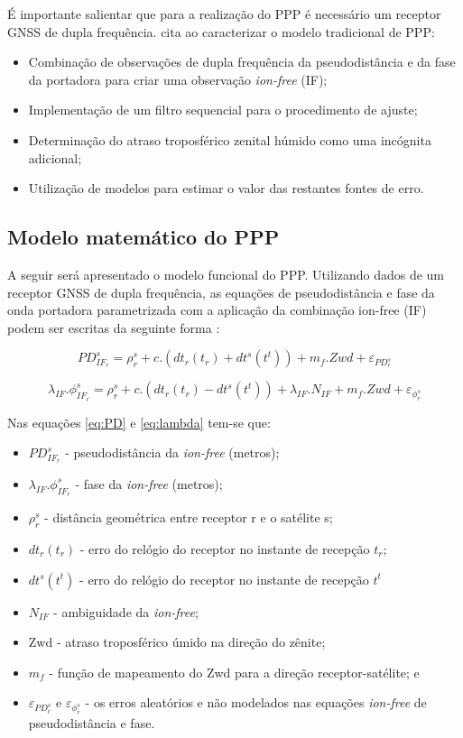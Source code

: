 É importante salientar que para a realização do PPP é necessário um receptor GNSS de dupla frequência. \cite{cunha2016_PPP} cita \cite{kouba2001precise} ao caracterizar o modelo tradicional de PPP:
\begin{itemize}
    \item Combinação de observações de dupla frequência da pseudodistância e da fase da portadora para criar uma observação \textit{ion-free} (IF);
    \item Implementação de um filtro sequencial para o procedimento de ajuste;
    \item Determinação do atraso troposférico zenital húmido como uma incógnita adicional;
    \item Utilização de modelos para estimar o valor das restantes fontes de erro.
\end{itemize}


\subsection{Modelo matemático do PPP}
\noindent

A seguir será apresentado o modelo funcional do PPP. Utilizando dados de um receptor GNSS de dupla frequência, as equações de pseudodistância e fase da onda portadora parametrizada com a aplicação da combinação ion-free (IF) podem ser escritas da seguinte forma \citep{marques2012ppp}:

\begin{equation}
    \label{eq:PD}
    PD_{IF_r}^{s}=\rho_r^s+c.(dt_r(t_r)+dt^s(t^t))+m_f.Zwd+\varepsilon_{PD_r^{s}}
\end{equation}

\begin{equation}
    \label{eq:lambda}
    \lambda_{IF}.\phi_{IF_r}^{s}=\rho_r^s+c.(dt_r(t_r)-dt^s(t^t))+\lambda_{IF}.N_{IF}+m_f.Zwd+\varepsilon_{\phi_r^{s}}
\end{equation}

Nas equações \ref{eq:PD} e \ref{eq:lambda} tem-se que:
\begin{itemize}
    \item $PD_{IF_r}^{s}$ - pseudodistância da \textit{ion-free} (metros);
    \item $\lambda_{IF}.\phi_{IF_r}^{s}$ - fase da \textit{ion-free} (metros);
    \item $\rho_r^s$ - distância geométrica entre receptor r e o satélite s;
    \item $dt_r(t_r)$ - erro do relógio do receptor no instante de recepção $t_r$;
    \item $dt^s(t^t)$ - erro do relógio do receptor no instante de recepção $t^t$
    \item $N_{IF}$ - ambiguidade da \textit{ion-free};
    \item Zwd - atraso troposférico úmido na direção do zênite;
    \item $m_f$ - função de mapeamento do Zwd para a direção receptor-satélite; e
    \item $\varepsilon_{PD_r^{s}}$ e $\varepsilon_{\phi_r^{s}}$ - os erros aleatórios e não modelados nas equações \textit{ion-free} de pseudodistância e fase.
\end{itemize}

